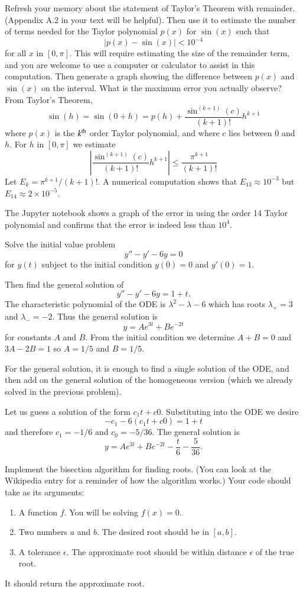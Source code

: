 \documentclass[minion]{homework}
\begin{document}
\begin{problems}

\problem Refresh your memory about the statement of Taylor's Theorem
with remainder.  (Appendix A.2 in your text will be helpful).  Then
use it to estimate the number of terms needed for the Taylor polynomial $p(x)$ for $\sin(x)$ such that
\[
|p(x)-\sin(x)|< 10^{-4}
\]
for all $x$ in $[0,\pi]$.  This will require estimating the size
of the remainder term, and you are welcome to use a computer or calculator to assist in this computation.  Then generate a graph
showing the difference between $p(x)$ and $\sin(x)$ on
the interval.  What is the maximum error you actually observe?
\solution
From Taylor's Theorem,
\[
\sin(h) = \sin(0+h) = p(h) + \frac{\sin^{(k+1)}(c)}{(k+1)!}h^{k+1}
\]
where $p(x)$ is the $k^{\rm th}$ order Taylor polynomial, and where
$c$ lies between $0$ and $h$.  For $h$ in $[0,\pi]$ we estimate
\[
\left| \frac{\sin^{(k+1)}(c)}{(k+1)!}h^{k+1} \right| \le \frac{\pi^{k+1}}{(k+1)!}
\]
Let $E_k = \pi^{k+1}/ (k+1)!$.  A numerical computation shows that
$E_{13}\approx 10^{-3}$ but $E_{14}\approx 2\times 10^{-5}$.  

The Jupyter notebook shows a graph of the error in using the order 14 
Taylor polynomial and confirms that the error is indeed less than
$10^4$.

\problem  Solve the initial value problem
\[
y''-y'-6y = 0
\]
for $y(t)$ subject to the initial condition $y(0)=0$ and
$y'(0)=1$.

Then find the general solution of
\[
y''-y'-6y = 1 + t.
\]
\subsol
The characteristic polynomial of the ODE is $\lambda^2-\lambda-6$ which has roots $\lambda_+=3$ and $\lambda_-=-2$.  Thus the
general solution is
\[
y = A e^{3t} + B e^{-2t}
\]
for constants $A$ and $B$.  From the initial condition we determine
$A+B=0$ and $3A-2B=1$ so $A=1/5$ and $B=1/5$.

\subsol
For the general solution, it is enough to find a single solution
of the ODE, and then add on the general solution of the homogeneous
version (which we already solved in the previous problem).

Let us guess a solution of the form $c_1 t + c0$.  
Substituting into the ODE we desire
\[
-c_1 -6(c_1 t+c0)  = 1+t
\]
and therefore $c_1=-1/6$ and $c_0=-5/36$.  The general solution
is
\[
y = A e^{3t} + B e^{-2t} -\frac{t}{6} -\frac{5}{36}.
\]

\problem Implement the bisection algorithm for finding roots.  (You
can look at the Wikipedia entry for a reminder of how the algorithm works.)
Your code should take as its arguments:
\begin{enumerate}
	\item A function $f$.  You will be solving $f(x)=0$.
	\item Two numbers $a$ and $b$.  The desired root should be in $[a,b]$.
	\item A tolerance $\epsilon$.  The approximate root should be within distance $\epsilon$ of the true root.
\end{enumerate}
It should return the approximate root.


\end{problems}
\end{document}
